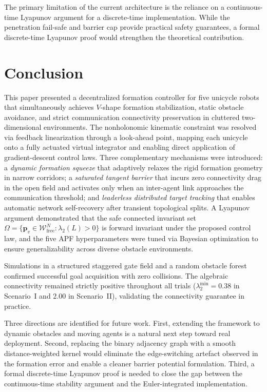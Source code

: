 \documentclass[letterpaper, 10 pt, journal, twoside]{IEEEtran}
\def\scr#1{{\mathcal #1}}
\begin{document}
The primary limitation of the current architecture is the reliance on a
continuous-time Lyapunov argument for a discrete-time implementation.  While
the penetration fail-safe and barrier cap provide practical safety guarantees,
a formal discrete-time Lyapunov proof would strengthen the theoretical
contribution.


\section{Conclusion}

This paper presented a decentralized formation controller for five unicycle
robots that simultaneously achieves $V$-shape formation stabilization,
static obstacle avoidance, and strict communication connectivity preservation
in cluttered two-dimensional environments.  The nonholonomic kinematic
constraint was resolved via feedback linearization through a look-ahead
point, mapping each unicycle onto a fully actuated virtual integrator and
enabling direct application of gradient-descent control laws.  Three
complementary mechanisms were introduced: a \emph{dynamic formation squeeze}
that adaptively relaxes the rigid formation geometry in narrow corridors; a
\emph{saturated tangent barrier} that incurs zero connectivity drag in the
open field and activates only when an inter-agent link approaches the
communication threshold; and \emph{leaderless distributed target tracking}
that enables automatic network self-recovery after transient topological
splits.  A Lyapunov argument demonstrated that the safe connected invariant
set $\Omega=\{\mathbf{p}_{v}\in\scr{W}_{\mathrm{free}}^{N}:\lambda_{2}(L)>0\}$
is forward invariant under the proposed control law, and the five APF
hyperparameters were tuned via Bayesian optimization to ensure
generalizability across diverse obstacle environments.

Simulations in a structured staggered gate field and a random obstacle
forest confirmed successful goal acquisition with zero collisions.  The
algebraic connectivity remained strictly positive throughout all trials
($\lambda_{2}^{\min}=0.38$ in Scenario~I and $2.00$ in Scenario~II),
validating the connectivity guarantee in practice.

Three directions are identified for future work.  First, extending the
framework to dynamic obstacles and moving agents is a natural next step
toward real deployment.  Second, replacing the binary adjacency graph with
a smooth distance-weighted kernel would eliminate the edge-switching
artefact observed in the formation error and enable a cleaner barrier
potential formulation.  Third, a formal discrete-time Lyapunov proof
is needed to close the gap between the continuous-time stability argument
and the Euler-integrated implementation.




\end{document}

